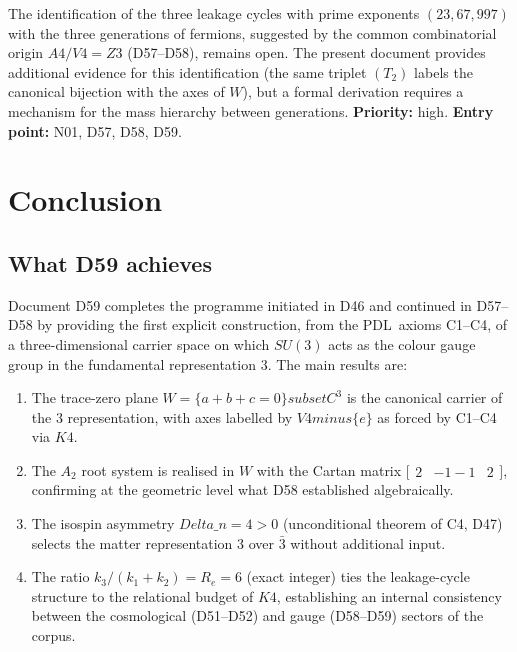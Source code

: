\documentclass[11pt,a4paper]{article}
\def\\{}%
\def\Vfour{V4}%
\def\Afour{A4}%
\def\Zthree{Z3}%
\def\SUthree{SU(3)}%
\def\Kfour{K4}%
\def\Re{Re}%
\def\PDL{PDL}%
\def\cong{=}%
\def\setminus{ minus }%
\def\subset{ subset }%
\def\mathbb#1{#1}%
\def\mathrm#1{#1}%
\def\mathbf#1{#1}%
\def\textsc#1{#1}%
\def\Dn{Delta\_n}%
\newenvironment{openproblem}[1][]{%
  \begin{tcolorbox}[openproblemstyle,title={Open Problem\ifx\relax#1\relax\else: #1\fi}]}{\end{tcolorbox}}
\theoremstyle{plain}
\theoremstyle{definition}
\theoremstyle{remark}
\newcommand{\PDL}{\textsc{PDL}}
\newcommand{\Kfour}{K_4}
\newcommand{\Afour}{A_4}
\newcommand{\Vfour}{V_4}
\newcommand{\Zthree}{\mathbb{Z}_3}
\newcommand{\SUthree}{\mathrm{SU}(3)}
\renewcommand{\Re}{R_e}
\newcommand{\Dn}{\Delta n}
\newcommand{\kone}{k_1}
\newcommand{\ktwo}{k_2}
\newcommand{\kthree}{k_3}
\begin{document}
\begin{openproblem}[OP-OFN-1 --- Three leakage cycles and three fermion generations]
\label{op:OFN-1}
The identification of the three leakage cycles with prime exponents $(23, 67, 997)$ with the three generations of fermions, suggested by the common combinatorial origin $\Afour/\Vfour \cong \Zthree$ (D57--D58), remains open. The present document provides additional evidence for this identification (the same triplet $(T_2)$ labels the canonical bijection with the axes of $W$), but a formal derivation requires a mechanism for the mass hierarchy between generations. \textbf{Priority:} high. \textbf{Entry point:} N01, D57, D58, D59.
\end{openproblem}

\section{Conclusion}
\label{sec:conclusion}

\subsection{What D59 achieves}

Document D59 completes the programme initiated in D46 and continued in D57--D58 by providing the first explicit construction, from the \PDL\ axioms C1--C4, of a three-dimensional carrier space on which $\SUthree$ acts as the colour gauge group in the fundamental representation $\mathbf{3}$. The main results are:
\begin{enumerate}[leftmargin=2em]
\item The trace-zero plane $W = \{a+b+c=0\} \subset \mathbb{C}^3$ is the canonical carrier of the $\mathbf{3}$ representation, with axes labelled by $\Vfour \setminus \{e\}$ as forced by C1--C4 via $\Kfour$.
\item The $A_2$ root system is realised in $W$ with the Cartan matrix $\bigl[\begin{smallmatrix}2&-1\\-1&2\end{smallmatrix}\bigr]$, confirming at the geometric level what D58 established algebraically.
\item The isospin asymmetry $\Dn = 4 > 0$ (unconditional theorem of C4, D47) selects the matter representation $\mathbf{3}$ over $\bar{\mathbf{3}}$ without additional input.
\item The ratio $\kthree/(\kone+\ktwo) = \Re = 6$ (exact integer) ties the leakage-cycle structure to the relational budget of $\Kfour$, establishing an internal consistency between the cosmological (D51--D52) and gauge (D58--D59) sectors of the corpus.
\end{enumerate}
\end{document}

